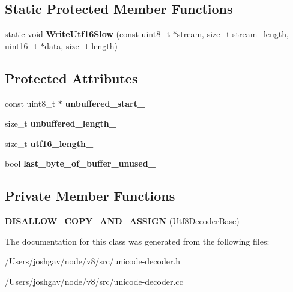 \subsection*{Static Protected Member Functions}
\begin{DoxyCompactItemize}
\item 
static void {\bfseries Write\+Utf16\+Slow} (const uint8\+\_\+t $\ast$stream, size\+\_\+t stream\+\_\+length, uint16\+\_\+t $\ast$data, size\+\_\+t length)\hypertarget{classunibrow_1_1_utf8_decoder_base_a64c83fd39968f57a6bdf0715b59ba6a0}{}\label{classunibrow_1_1_utf8_decoder_base_a64c83fd39968f57a6bdf0715b59ba6a0}

\end{DoxyCompactItemize}
\subsection*{Protected Attributes}
\begin{DoxyCompactItemize}
\item 
const uint8\+\_\+t $\ast$ {\bfseries unbuffered\+\_\+start\+\_\+}\hypertarget{classunibrow_1_1_utf8_decoder_base_a620ab5ad498ac7c203e22b40a1354480}{}\label{classunibrow_1_1_utf8_decoder_base_a620ab5ad498ac7c203e22b40a1354480}

\item 
size\+\_\+t {\bfseries unbuffered\+\_\+length\+\_\+}\hypertarget{classunibrow_1_1_utf8_decoder_base_a0c9ea3cb5d9ec083c28b13fde40b40f4}{}\label{classunibrow_1_1_utf8_decoder_base_a0c9ea3cb5d9ec083c28b13fde40b40f4}

\item 
size\+\_\+t {\bfseries utf16\+\_\+length\+\_\+}\hypertarget{classunibrow_1_1_utf8_decoder_base_af597f9d62ba438dd113aca3091fa68d2}{}\label{classunibrow_1_1_utf8_decoder_base_af597f9d62ba438dd113aca3091fa68d2}

\item 
bool {\bfseries last\+\_\+byte\+\_\+of\+\_\+buffer\+\_\+unused\+\_\+}\hypertarget{classunibrow_1_1_utf8_decoder_base_a4d7b287ba276aca48744da8576209ddd}{}\label{classunibrow_1_1_utf8_decoder_base_a4d7b287ba276aca48744da8576209ddd}

\end{DoxyCompactItemize}
\subsection*{Private Member Functions}
\begin{DoxyCompactItemize}
\item 
{\bfseries D\+I\+S\+A\+L\+L\+O\+W\+\_\+\+C\+O\+P\+Y\+\_\+\+A\+N\+D\+\_\+\+A\+S\+S\+I\+GN} (\hyperlink{classunibrow_1_1_utf8_decoder_base}{Utf8\+Decoder\+Base})\hypertarget{classunibrow_1_1_utf8_decoder_base_a3c7db0e6a6bbe1c2cccf4094f95ec8f3}{}\label{classunibrow_1_1_utf8_decoder_base_a3c7db0e6a6bbe1c2cccf4094f95ec8f3}

\end{DoxyCompactItemize}


The documentation for this class was generated from the following files\+:\begin{DoxyCompactItemize}
\item 
/\+Users/joshgav/node/v8/src/unicode-\/decoder.\+h\item 
/\+Users/joshgav/node/v8/src/unicode-\/decoder.\+cc\end{DoxyCompactItemize}

